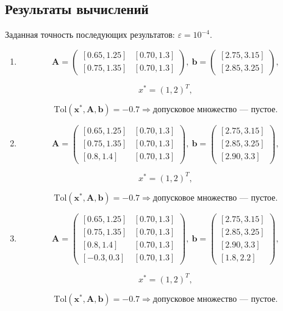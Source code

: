 \documentclass{article}
\begin{document}
  \subsection{Результаты вычислений}

  Заданная точность последующих результатов: \( \varepsilon = 10^{-4} \).

  \begin{enumerate}
    \item
      \[
        \mathbf{A} = \begin{pmatrix}
          [0.65, 1.25] & [0.70, 1.3] \\
          [0.75, 1.35] & [0.70, 1.3]
        \end{pmatrix},
        ~
        \mathbf{b} = \begin{pmatrix}
          [2.75, 3.15] \\
          [2.85, 3.25]
        \end{pmatrix},
      \]

      \[ x^* = (1, 2)^T, \]

      \[
        \text{Tol}(\mathbf{x}^*, \mathbf{A}, \mathbf{b}) = -0.7
        \Rightarrow \text{допусковое множество --- пустое}.
      \]
    \item
      \[
        \mathbf{A} = \begin{pmatrix}
          [0.65, 1.25] & [0.70, 1.3] \\
          [0.75, 1.35] & [0.70, 1.3] \\
          [0.8, 1.4] & [0.70, 1.3]
        \end{pmatrix},
        ~
        \mathbf{b} = \begin{pmatrix}
          [2.75, 3.15] \\
          [2.85, 3.25] \\
          [2.90, 3.3]
        \end{pmatrix},
      \]

      \[ x^* = (1, 2)^T, \]

      \[
        \text{Tol}(\mathbf{x}^*, \mathbf{A}, \mathbf{b}) = -0.7 \Rightarrow \text{допусковое множество --- пустое}.
      \]
    \item
      \[
        \mathbf{A} = \begin{pmatrix}
          [0.65, 1.25] & [0.70, 1.3] \\
          [0.75, 1.35] & [0.70, 1.3] \\
          [0.8, 1.4] & [0.70, 1.3] \\
          [-0.3, 0.3] & [0.70, 1.3]
        \end{pmatrix},
        ~
        \mathbf{b} = \begin{pmatrix}
          [2.75, 3.15] \\
          [2.85, 3.25] \\
          [2.90, 3.3] \\
          [1.8, 2.2]
        \end{pmatrix},
      \]

      \[ x^* = (1, 2)^T, \]

      \[
        \text{Tol}(\mathbf{x}^*, \mathbf{A}, \mathbf{b}) = -0.7 \Rightarrow \text{допусковое множество --- пустое}.
      \]
  \end{enumerate}
\end{document}
